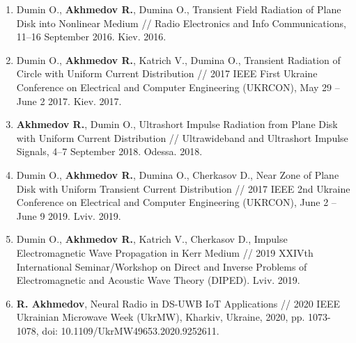 {\begin{center}
\begin{enumerate}
			\item Dumin O., \textbf{Akhmedov R.}, Dumina O., Transient Field 
			Radiation of Plane Disk into Nonlinear Medium // Radio Electronics and 
			Info Communications, 11--16 September 2016. Kiev. 2016.
			
			\item Dumin O., \textbf{Akhmedov R.}, Katrich V., Dumina O., Transient 
			Radiation of Circle with Uniform Current Distribution // 2017 IEEE First 
			Ukraine Conference on Electrical and Computer Engineering (UKRCON), 
			May 29 -- June 2 2017. Kiev. 2017.
			
			\item \textbf{Akhmedov R.}, Dumin O., Ultrashort Impulse Radiation from 
			Plane Disk with Uniform Current Distribution // Ultrawideband and 
			Ultrashort Impulse Signals, 4--7 September 2018. Odessa. 2018.
			
			\item Dumin O., \textbf{Akhmedov R.}, Dumina O., Cherkasov D., Near Zone 
			of Plane Disk with Uniform Transient Current Distribution // 2017 IEEE 2nd 
			Ukraine Conference on Electrical and Computer Engineering (UKRCON), 
			June 2 -- June 9 2019. Lviv. 2019.
			
			\item Dumin O., \textbf{Akhmedov R.}, Katrich V., Cherkasov D., 
			Impulse Electromagnetic Wave Propagation in Kerr Medium // 2019 XXIVth 
			International Seminar/Workshop on Direct and Inverse Problems of 
			Electromagnetic and Acoustic Wave Theory (DIPED). Lviv. 2019.
			
			\item  \textbf{R. Akhmedov}, Neural Radio in DS-UWB IoT Applications // 2020 
			IEEE Ukrainian Microwave Week (UkrMW), Kharkiv, Ukraine, 2020, pp. 1073-1078, 
			doi: 10.1109/UkrMW49653.2020.9252611.
			
			\setcounter{ItemsInMyWriting}{\value{enumi}}
		\end{enumerate}
		
	\end{center}
	
}